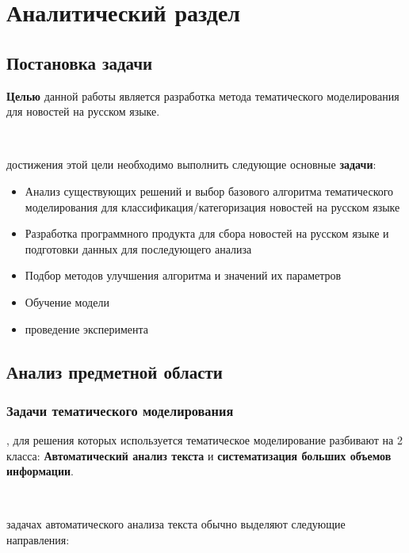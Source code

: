 \chapter{Аналитический раздел}

%
\section{Постановка задачи}

\noindent\textbf{Целью} данной работы является разработка метода тематического моделирования для новостей на русском языке.

~\

 достижения этой цели необходимо выполнить следующие основные \textbf{задачи}:

\begin{itemize}
    \item \todo{}Анализ существующих решений и выбор базового алгоритма тематического моделирования для классификация/категоризация новостей на русском языке
    \item Разработка программного продукта для сбора новостей на русском языке и подготовки данных для последующего анализа
    \item Подбор методов улучшения алгоритма и значений их параметров
    \item Обучение модели
    \item \todo{}проведение эксперимента
\end{itemize}

%
\section{Анализ предметной области}

\subsection{Задачи тематического моделирования}

, для решения которых используется тематическое моделирование разбивают на 2 класса: \textbf{Автоматический анализ текста} и \textbf{систематизация больших объемов информации}.

~\

 задачах автоматического анализа текста обычно выделяют следующие направления:


